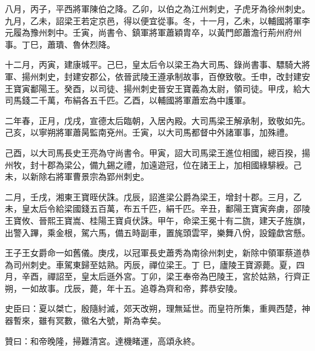 \begin{pinyinscope}
 八月，丙子，平西將軍陳伯之降。乙卯，以伯之為江州刺史，子虎牙為徐州刺史。九月，乙未，詔梁王若定京邑，得以便宜從事。冬，十一月，乙未，以輔國將軍李元履為豫州刺中。壬寅，尚書令、鎮軍將軍蕭穎胄卒，以黃門郎蕭澹行荊州府州事。丁巳，蕭璝、魯休烈降。



 十二月，丙寅，建康城平。己巳，皇太后令以梁王為大司馬、錄尚書事、驃騎大將軍、揚州刺史，封建安郡公，依晉武陵王遵承制故事，百僚致敬。壬申，改封建安王寶寅鄱陽王。癸酉，以司徒、揚州刺史晉安王寶義為太尉，領司徒。甲戌，給大司馬錢二千萬，布絹各五千匹。乙酉，以輔國將軍蕭宏為中護軍。



 二年春，正月，戊戌，宣德太后臨朝，入居內殿。大司馬梁王解承制，致敬如先。己亥，以寧朔將軍蕭昺監南兗州。壬寅，以大司馬都督中外諸軍事，加殊禮。



 己酉，以大司馬長史王亮為守尚書令。甲寅，詔大司馬梁王進位相國，總百揆，揚州牧，封十郡為梁公，備九錫之禮，加遠遊冠，位在諸王上，加相國綠騑綬。己未，以新除右將軍曹景宗為郢州刺史。



 二月，壬戌，湘東王寶晊伏誅。戊辰，詔進梁公爵為梁王，增封十郡。三月，乙未，皇太后令給梁國錢五百萬，布五千匹，絹千匹。辛丑，鄱陽王寶寅奔虜，邵陵王寶攸、晉熙王寶嵩、桂陽王寶貞伏誅。甲午，命梁王冕十有二旒，建天子旌旗，出警入蹕，乘金根，駕六馬，備五時副車，置旄頭雲罕，樂舞八佾，設鐘歔宮懸。



 王子王女爵命一如舊儀。庚戌，以冠軍長史蕭秀為南徐州刺史，新除中領軍蔡道恭為司州刺史。車駕東歸至姑熟。丙辰，禪位梁王。丁
 巳，廬陵王寶源薨。夏，四月，辛酉，禪詔至，皇太后遜外宮。丁卯，梁王奉帝為巴陵王，宮於姑熟，行齊正朔，一如故事。戊辰，薨，年十五。追尊為齊和帝，葬恭安陵。



 史臣曰：夏以桀亡，殷隨紂滅，郊天改朔，理無延世。而皇符所集，重興西楚，神器暫來，雖有冥數，徽名大號，斯為幸矣。



 贊曰：和帝晚隆，掃難清宮。達機睹運，高頌永終。



\end{pinyinscope}